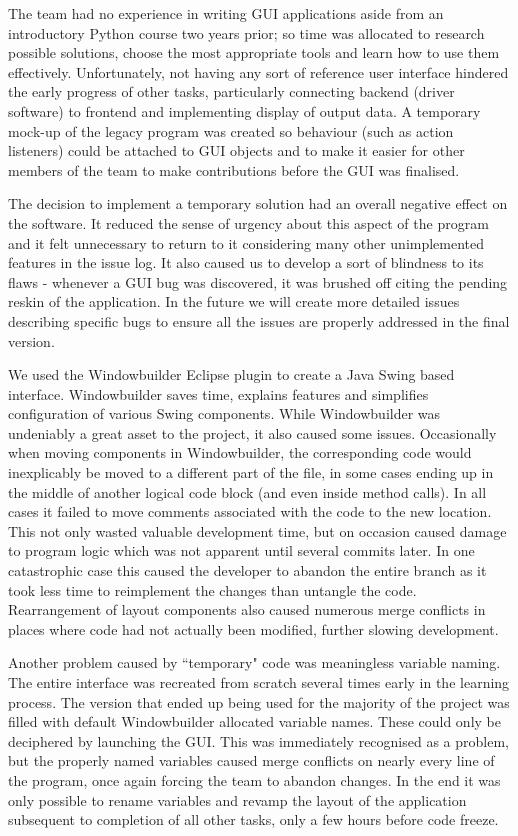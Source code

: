 \documentclass{l3proj}
\begin{document}
The team had no experience in writing GUI applications aside from an introductory Python course two years prior; so time was allocated to research possible solutions, choose the most appropriate tools and learn how to use them effectively. Unfortunately, not having any sort of reference user interface hindered the early progress of other tasks, particularly connecting backend (driver software) to frontend and implementing display of output data. A temporary mock-up of the legacy program was created so behaviour (such as action listeners) could be attached to GUI objects and to make it easier for other members of the team to make contributions before the GUI was finalised.

The decision to implement a temporary solution had an overall negative effect on the software. It reduced the sense of urgency about this aspect of the program and it felt unnecessary to return to it considering many other unimplemented features in the issue log. It also caused us to develop a sort of blindness to its flaws - whenever a GUI bug was discovered, it was brushed off citing the pending reskin of the application. In the future we will create more detailed issues describing specific bugs to ensure all the issues are properly addressed in the final version.

We used the Windowbuilder Eclipse plugin to create a Java Swing based interface. Windowbuilder saves time, explains features and simplifies configuration of various Swing components\cite{windowbuilder}. While Windowbuilder was undeniably a great asset to the project, it also caused some issues. Occasionally when moving components in Windowbuilder, the corresponding code would inexplicably be moved to a different part of the file, in some cases ending up in the middle of another logical code block (and even inside method calls). In all cases it failed to move comments associated with the code to the new location. This not only wasted valuable development time, but on occasion caused damage to program logic which was not apparent until several commits later. In one catastrophic case this caused the developer to abandon the entire branch as it took less time to reimplement the changes than untangle the code. Rearrangement of layout components also caused numerous merge conflicts in places where code had not actually been modified, further slowing development.

Another problem caused by ``temporary" code was meaningless variable naming. The entire interface was recreated from scratch several times early in the learning process. The version that ended up being used for the majority of the project was filled with default Windowbuilder allocated variable names. These could only be deciphered by launching the GUI. This was immediately recognised as a problem, but the properly named variables caused merge conflicts on nearly every line of the program, once again forcing the team to abandon changes. In the end it was only possible to rename variables and revamp the layout of the application subsequent to completion of all other tasks, only a few hours before code freeze.
\end{document}
